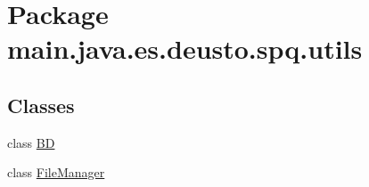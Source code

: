 \hypertarget{namespacemain_1_1java_1_1es_1_1deusto_1_1spq_1_1utils}{}\section{Package main.\+java.\+es.\+deusto.\+spq.\+utils}
\label{namespacemain_1_1java_1_1es_1_1deusto_1_1spq_1_1utils}
\subsection*{Classes}
\begin{DoxyCompactItemize}
\item 
class \hyperlink{classmain_1_1java_1_1es_1_1deusto_1_1spq_1_1utils_1_1_b_d}{BD}
\item 
class \hyperlink{classmain_1_1java_1_1es_1_1deusto_1_1spq_1_1utils_1_1_file_manager}{File\+Manager}
\end{DoxyCompactItemize}
